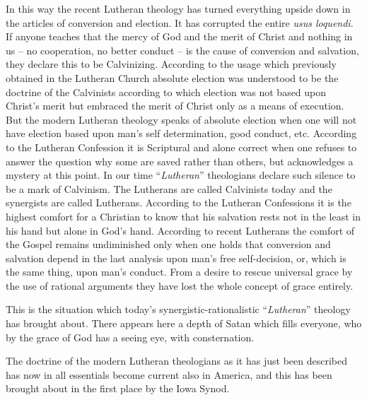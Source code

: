                 In this way the recent Lutheran theology has turned everything upside down in the articles of conversion and election.  It has corrupted the entire \textit{usus loquendi}.  If anyone teaches that the mercy of God and the merit of Christ and nothing in us – no cooperation, no better conduct – is the cause of conversion and salvation, they declare this to be Calvinizing.  According to the usage which previously obtained in the Lutheran Church absolute election was understood to be the doctrine of the Calvinists according to which election was not based upon Christ’s merit but embraced the merit of Christ only as a means of execution.  But the modern Lutheran theology speaks of absolute election when one will not have election based upon man's self determination, good conduct, etc.  According to the Lutheran Confession it is Scriptural and alone correct when one refuses to answer the question why some are saved rather than others, but acknowledges a mystery at this point.  In our time “\textit{Lutheran}” theologians declare such silence to be a mark of Calvinism.  The Lutherans are called Calvinists today and the synergists are called Lutherans.  According to the Lutheran Confessions it is the highest comfort for a Christian to know that his salvation rests not in the least in his hand but alone in God’s hand.  According to recent Lutherans the comfort of the Gospel remains undiminished only when one holds that conversion and salvation depend in the last analysis upon man’s free self-decision, or, which is the same thing, upon man’s conduct.  From a desire to rescue universal grace by the use of rational arguments they have lost the whole concept of grace entirely.

                This is the situation which today’s synergistic-rationalistic “\textit{Lutheran}” theology has brought about.  There appears here a depth of Satan which fills everyone, who by the grace of God has a seeing eye, with consternation.

                The doctrine of the modern Lutheran theologians as it has just been described has now in all essentials become current also in America, and this has been brought about in the first place by the Iowa Synod.

